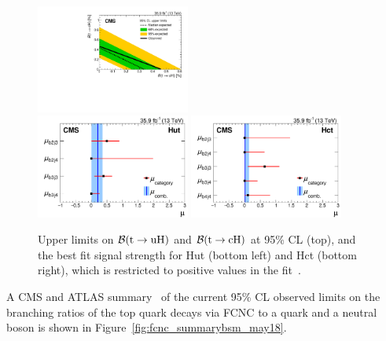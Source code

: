 \documentclass{PoS}
\begin{document}
\begin{figure}[htb]
\centering
\includegraphics[width=0.45\textwidth]{figures/CMS-TOP-17-003_Figure_006}\\
\includegraphics[width=0.45\textwidth]{figures/CMS-TOP-17-003_Figure_007-a}
\includegraphics[width=0.45\textwidth]{figures/CMS-TOP-17-003_Figure_007-b}
\caption{
  Upper limits on ${\cal B}({\rm t \to uH})$ and ${\cal B}({\rm t \to cH})$ at
  95\% CL (top), and the best fit signal strength for Hut (bottom left) and Hct
  (bottom right), which is restricted to positive values in the
  fit~\cite{top-17-003}.
}
\label{fig:TOP-17-003_Figures_006-007}
\end{figure}

A CMS and ATLAS summary~\cite{cms-atlas-fcnc} of the current 95\% CL observed
limits on the branching ratios of the top quark decays via FCNC to a quark and
a neutral boson is shown in Figure~\ref{fig:fcnc_summarybsm_may18}.
\end{document}
